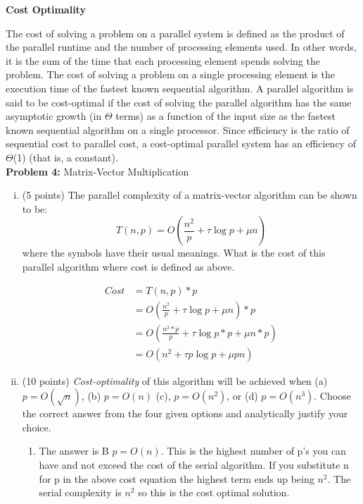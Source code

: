 \documentclass{article}
\begin{document}
    \textbf{Cost Optimality}
    
    The cost of solving a problem on a parallel system is defined as the product of the parallel runtime and
    the number of processing elements used. In other words, it is the sum of the time that each processing
    element spends solving the problem. The cost of solving a problem on a single processing element is the
    execution time of the fastest known sequential algorithm. A parallel algorithm is said to be cost-optimal
    if the cost of solving the parallel algorithm has the same asymptotic growth (in $\Theta$ terms) as a function of
    the input size as the fastest known sequential algorithm on a single processor. Since efficiency is the ratio
    of sequential cost to parallel cost, a cost-optimal parallel system has an efficiency of $\Theta$(1) (that is, a constant). \\


    \textbf{Problem 4:} Matrix-Vector Multiplication
    \begin{enumerate}[i.]
    \item (5 points) The parallel complexity of a matrix-vector algorithm can be shown to be:    
    \begin{equation}
        T(n,p) = O(\frac{n^2}{p} + \tau\log{p}+\mu{n})
    \end{equation}    
    where the symbols have their usual meanings. What is the cost of this parallel algorithm where cost is
defined as above.

    \begin{align*}
        Cost &= T(n,p) * p\\
        &= O(\frac{n^2}{p} + \tau\log{p}+\mu{n})*p\\
        &= O(\frac{n^2*p}{p} + \tau\log{p}*p+\mu{n}*p)\\
        &= O(n^2 + \tau{p}\log{p} + \mu{p}n)
    \end{align*}

    \item (10 points) \textit{Cost-optimality} of this algorithm will be achieved when (a) $p = O(\sqrt{n})$, (b) $p = O(n)$ (c),
    $p = O(n^2)$, or (d) $p = O(n^3)$. Choose the correct answer from the four given options and analytically
    justify your choice.

    \begin{enumerate}
        \item The answer is B $p = O(n)$. This is the highest number of p's you can have and not exceed the cost of the serial algorithm.
        If you substitute n for p in the above cost equation the highest term ends up being $n^2$. The serial complexity is $n^2$ so this is the cost optimal solution.
    \end{enumerate}
    \end{enumerate}
\end{document}

